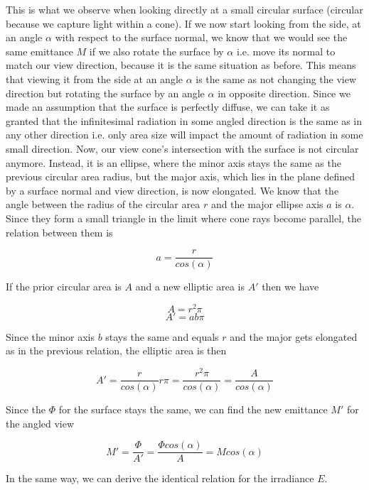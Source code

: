 \documentclass{article}
\begin{document}
This is what we observe when looking directly at a small circular surface (circular because we capture light within a cone). If we now start looking from the side, at an angle $\alpha$ with respect to the surface normal, we know that we would see the same emittance $M$ if we also rotate the surface by $\alpha$ i.e. move its normal to match our view direction, because it is the same situation as before. This means that viewing it from the side at an angle $\alpha$ is the same as not changing the view direction but rotating the surface by an angle $\alpha$ in opposite direction. Since we made an assumption that the surface is perfectly diffuse, we can take it as granted that the infinitesimal radiation in some angled direction is the same as in any other direction i.e. only area size will impact the amount of radiation in some small direction. Now, our view cone's intersection with the surface is not circular anymore. Instead, it is an ellipse, where the minor axis stays the same as the previous circular area radius, but the major axis, which lies in the plane defined by a surface normal and view direction, is now elongated. We know that the angle between the radius of the circular area $r$ and the major ellipse axis $a$ is $\alpha$. Since they form a small triangle in the limit where cone rays become parallel, the relation between them is

\[ a = \frac{r}{cos(\alpha)} \]

If the prior circular area is $A$ and a new elliptic area is $A'$ then we have

\[ A = r^2\pi \]
\[ A' = ab\pi \]

Since the minor axis $b$ stays the same and equals $r$ and the major gets elongated as in the previous relation, the elliptic area is then

\[ A' = \frac{r}{cos(\alpha)}r\pi = \frac{r^2\pi}{cos(\alpha)} = \frac{A}{cos(\alpha)} \]

Since the $\Phi$ for the surface stays the same, we can find the new emittance $M'$ for the angled view

\[ M' = \frac{\Phi}{A'} = \frac{\Phi cos(\alpha)}{A} = Mcos(\alpha) \]

In the same way, we can derive the identical relation for the irradiance $E$.
\end{document}
